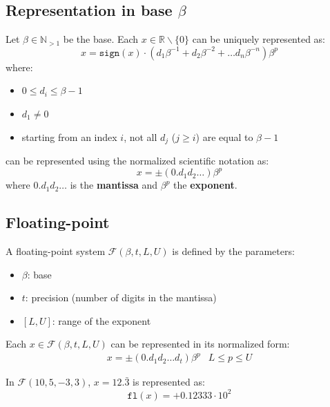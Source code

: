 \subsection{Representation in base \texorpdfstring{$\beta$}{B}}

Let $\beta \in \mathbb{N}_{> 1}$ be the base.
Each $x \in \mathbb{R} \smallsetminus \{0\}$ can be uniquely represented as:
\begin{equation} \label{eq:finnum_b_representation}
    x = \texttt{sign}(x) \cdot (d_1\beta^{-1} + d_2\beta^{-2} + \dots d_n\beta^{-n})\beta^p
\end{equation}
where:
\begin{itemize}
    \item $0 \leq d_i \leq \beta-1$
    \item $d_1 \neq 0$
    \item starting from an index $i$, not all $d_j$ ($j \geq i$) are equal to $\beta-1$
\end{itemize}
%
 can be represented using the normalized scientific notation as:
\begin{equation}
    x = \pm (0.d_1d_2\dots) \beta^p
\end{equation}
where $0.d_1d_2\dots$ is the \textbf{mantissa} and $\beta^p$ the \textbf{exponent}.



\subsection{Floating-point}

A floating-point system $\mathcal{F}(\beta, t, L, U)$ is defined by the parameters:
\begin{itemize}
    \item $\beta$: base
    \item $t$: precision (number of digits in the mantissa)
    \item $[L, U]$: range of the exponent
\end{itemize}
%
Each $x \in \mathcal{F}(\beta, t, L, U)$ can be represented in its normalized form:
\begin{eqnarray}
    x = \pm (0.d_1d_2 \dots d_t) \beta^p & L \leq p \leq U
\end{eqnarray}
\begin{example}
    In $\mathcal{F}(10, 5, -3, 3)$, $x=12.\bar{3}$ is represented as:
    \begin{equation*}
        \texttt{fl}(x) = + 0.12333 \cdot 10^2
    \end{equation*}
\end{example}


